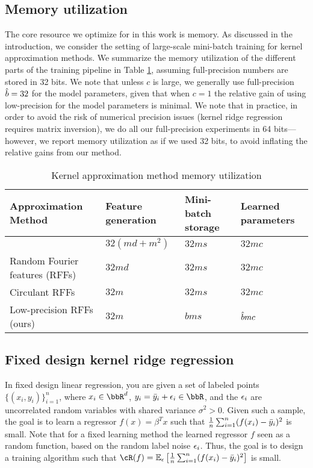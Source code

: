 \subsection{Memory utilization}
\label{subsec:memory_utils}
The core resource we optimize for in this work is memory.  As discussed in the introduction, we consider the setting of large-scale mini-batch training for kernel approximation methods.  We summarize the memory utilization of the different parts of the training pipeline in Table \ref{table:mem-usage}, assuming full-precision numbers are stored in 32 bits. We note that unless $c$ is large, we generally use full-precision $\hat{b} = 32$ for the model parameters, given that when $c=1$ the relative gain of using low-precision for the model parameters is minimal.  We note that in practice, in order to avoid the risk of numerical precision issues (kernel ridge regression requires matrix inversion), we do all our full-precision experiments in 64 bits---however, we report memory utilization as if we used 32 bits, to avoid inflating the relative gains from our method.

\begin{table}
	\caption{Kernel approximation method memory utilization}
	\label{table:mem-usage}
	\centering
	\begin{tabular}{llll}
		\toprule
		Approximation Method & Feature generation & Mini-batch storage & Learned parameters \\
		\midrule
		\Nystrom \citep{nystrom} & $32(md + m^2)$ & $32ms$ & $32mc$ \\
		Random Fourier features (RFFs) \citep{rahimi07random} &  $32md$ & $32ms$ & $32mc$ \\
		Circulant RFFs \citep{yu15} & $32m$ & $32ms$ & $32mc$ \\
		Low-precision RFFs (ours)& $32m$ & $bms$ & $\hat{b} mc$ \\
		\bottomrule
	\end{tabular}
\end{table}

\subsection{Fixed design kernel ridge regression}
In fixed design linear regression, you are given a set of labeled points $\{(x_i,y_i)\}_{i=1}^n$, where $x_i \in \RR^d$, $y_i = \by_i + \eps_i \in \RR$, and the $\epsilon_i$ are uncorrelated random variables with shared variance $\sigma^2 > 0$.  Given such a sample, the goal is to learn a regressor $f(x) = \beta^T x$ such that $\frac{1}{n}\sum_{i=1}^n (f(x_i) - \bar{y}_i)^2$ is small. Note that for a fixed learning method the learned regressor $f$ seen as a random function, based on the random label noise $\epsilon_i$.  Thus, the goal is to design a training algorithm such that $\cR(f) = \expect{\eps}{\frac{1}{n}\sum_{i=1}^n (f(x_i) - \by_i)^2}$ is small.

